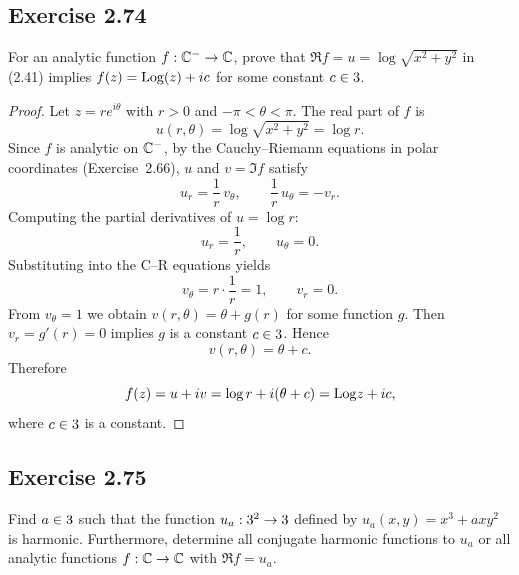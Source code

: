 \documentclass{article}
\begin{document}
\subsection{Exercise 2.74}

For an analytic function $f : \mathbb{C}^- \to \mathbb{C}$, prove that $\Re f = u =
\log \sqrt{x^2+y^2}$ in (2.41) implies $f(z) = \mathrm{Log}(z) + ic$ for some
constant $c \in 3$.

\begin{proof}
  Let $z = re^{i\theta}$ with $r > 0$ and $-\pi < \theta < \pi$. The real
  part of $f$ is
  \[
    u(r, \theta) = \log\sqrt{x^2 + y^2} = \log r.
  \]
  Since $f$ is analytic on $\mathbb{C}^-$, by the Cauchy--Riemann equations in
  polar coordinates (Exercise~2.66), $u$ and $v = \Im f$ satisfy
  \[
    u_r = \frac{1}{r}\,v_\theta, \qquad \frac{1}{r}\,u_\theta = -v_r.
  \]
  Computing the partial derivatives of $u = \log r$:
  \[
    u_r = \frac{1}{r}, \qquad u_\theta = 0.
  \]
  Substituting into the C--R equations yields
  \[
    v_\theta = r \cdot \frac{1}{r} = 1, \qquad v_r = 0.
  \]
  From $v_\theta = 1$ we obtain $v(r, \theta) = \theta + g(r)$ for some
  function $g$. Then $v_r = g'(r) = 0$ implies $g$ is a constant $c \in
  3$. Hence
  \[
    v(r, \theta) = \theta + c.
  \]
  Therefore
  \[
    f(z) = u + iv = \log r + i(\theta + c) = \mathrm{Log} z + ic,
  \]
  where $c \in 3$ is a constant.
\end{proof}

\subsection{Exercise 2.75}

Find $a \in 3$ such that the function $u_a : 3^2 \to 3$ defined by
$u_a(x, y) = x^3 + axy^2$ is harmonic. Furthermore, determine all
conjugate harmonic functions to $u_a$ or all analytic functions $f :
\mathbb{C} \to \mathbb{C}$ with $\Re f = u_a$.
\end{document}
